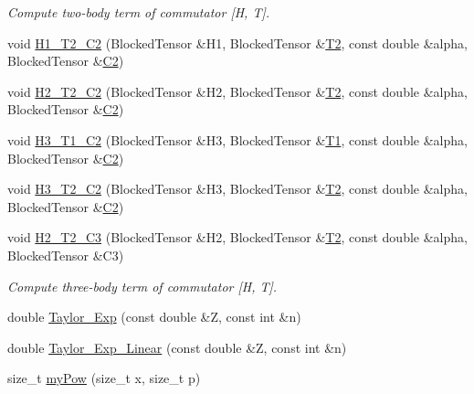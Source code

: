 \begin{DoxyCompactItemize}
\begin{DoxyCompactList}\small\item\em Compute two-\/body term of commutator \mbox{[}H, T\mbox{]}. \end{DoxyCompactList}\item 
void \mbox{\hyperlink{classforte_1_1_m_r_d_s_r_g___s_o_a50c18e062da19c4ab2f29e261e59fd91}{H1\+\_\+\+T2\+\_\+\+C2}} (Blocked\+Tensor \&H1, Blocked\+Tensor \&\mbox{\hyperlink{classforte_1_1_m_r_d_s_r_g___s_o_a43f64aec5c3777de5bc476ae946e0928}{T2}}, const double \&alpha, Blocked\+Tensor \&\mbox{\hyperlink{namespaceforte_abe00ec86d0015c0f2b6ac298c6e428e4af1a543f5a2c5d49bc5dde298fcf716e4}{C2}})
\item 
void \mbox{\hyperlink{classforte_1_1_m_r_d_s_r_g___s_o_a498736d23cea3e3cdf2aaa754dbdf24b}{H2\+\_\+\+T2\+\_\+\+C2}} (Blocked\+Tensor \&H2, Blocked\+Tensor \&\mbox{\hyperlink{classforte_1_1_m_r_d_s_r_g___s_o_a43f64aec5c3777de5bc476ae946e0928}{T2}}, const double \&alpha, Blocked\+Tensor \&\mbox{\hyperlink{namespaceforte_abe00ec86d0015c0f2b6ac298c6e428e4af1a543f5a2c5d49bc5dde298fcf716e4}{C2}})
\item 
void \mbox{\hyperlink{classforte_1_1_m_r_d_s_r_g___s_o_a3402c72b00908658d4f86b12de1a46e1}{H3\+\_\+\+T1\+\_\+\+C2}} (Blocked\+Tensor \&H3, Blocked\+Tensor \&\mbox{\hyperlink{classforte_1_1_m_r_d_s_r_g___s_o_afa42761edf9b73171b843cbb11b575c1}{T1}}, const double \&alpha, Blocked\+Tensor \&\mbox{\hyperlink{namespaceforte_abe00ec86d0015c0f2b6ac298c6e428e4af1a543f5a2c5d49bc5dde298fcf716e4}{C2}})
\item 
void \mbox{\hyperlink{classforte_1_1_m_r_d_s_r_g___s_o_a20900cc7acb61c4a92be961021a7bf78}{H3\+\_\+\+T2\+\_\+\+C2}} (Blocked\+Tensor \&H3, Blocked\+Tensor \&\mbox{\hyperlink{classforte_1_1_m_r_d_s_r_g___s_o_a43f64aec5c3777de5bc476ae946e0928}{T2}}, const double \&alpha, Blocked\+Tensor \&\mbox{\hyperlink{namespaceforte_abe00ec86d0015c0f2b6ac298c6e428e4af1a543f5a2c5d49bc5dde298fcf716e4}{C2}})
\item 
void \mbox{\hyperlink{classforte_1_1_m_r_d_s_r_g___s_o_a871a5e2f6b8ebdf9a28c2014148a08e3}{H2\+\_\+\+T2\+\_\+\+C3}} (Blocked\+Tensor \&H2, Blocked\+Tensor \&\mbox{\hyperlink{classforte_1_1_m_r_d_s_r_g___s_o_a43f64aec5c3777de5bc476ae946e0928}{T2}}, const double \&alpha, Blocked\+Tensor \&C3)
\begin{DoxyCompactList}\small\item\em Compute three-\/body term of commutator \mbox{[}H, T\mbox{]}. \end{DoxyCompactList}\item 
double \mbox{\hyperlink{classforte_1_1_m_r_d_s_r_g___s_o_aa3ccdbd209dabe45cceccfbad6723cca}{Taylor\+\_\+\+Exp}} (const double \&Z, const int \&n)
\item 
double \mbox{\hyperlink{classforte_1_1_m_r_d_s_r_g___s_o_ae9006236a33351dad78737db9a55c31b}{Taylor\+\_\+\+Exp\+\_\+\+Linear}} (const double \&Z, const int \&n)
\item 
size\+\_\+t \mbox{\hyperlink{classforte_1_1_m_r_d_s_r_g___s_o_aea3227de433a80f1ebc2072b8750170c}{my\+Pow}} (size\+\_\+t x, size\+\_\+t p)
\end{DoxyCompactItemize}
